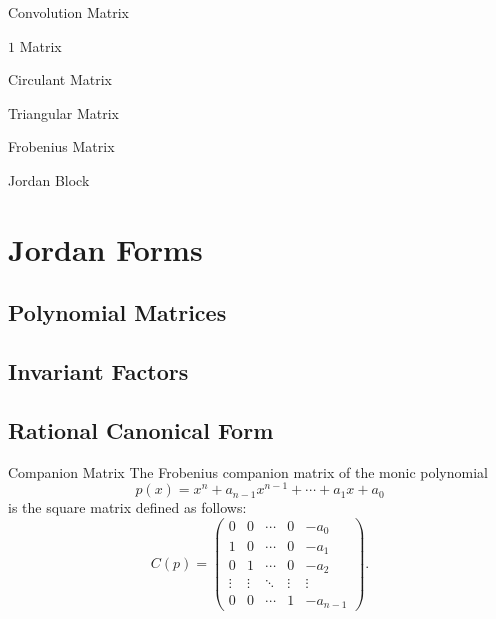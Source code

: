 \documentclass[11pt]{../../TexTemplate/elegantbook} %
\begin{document}
\begin{leftbarTitle}{Convolution Matrix}\end{leftbarTitle}

\begin{leftbarTitle}{\(1\) Matrix}\end{leftbarTitle}

\begin{leftbarTitle}{Circulant Matrix}\end{leftbarTitle}

\begin{leftbarTitle}{Triangular Matrix}\end{leftbarTitle}

\begin{leftbarTitle}{Frobenius Matrix}\end{leftbarTitle}

\begin{leftbarTitle}{Jordan Block}\end{leftbarTitle}


\chapter{Jordan Forms}
\section{Polynomial Matrices}

\section{Invariant Factors}

\section{Rational Canonical Form}
\begin{definition}{Companion Matrix}
    The Frobenius companion matrix of the monic polynomial
    \[
    p(x) = x^n + a_{n-1}x^{n-1} + \cdots + a_1 x + a_0
    \]
    is the square matrix defined as follows:
    \[
    C(p) = \begin{pmatrix}
    0 & 0 & \cdots & 0 & -a_0 \\
    1 & 0 & \cdots & 0 & -a_1 \\
    0 & 1 & \cdots & 0 & -a_2 \\
    \vdots & \vdots & \ddots & \vdots & \vdots \\
    0 & 0 & \cdots & 1 & -a_{n-1}
    \end{pmatrix}.
    \]
\end{definition}
\end{document}
